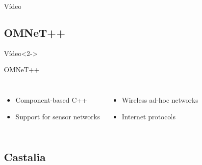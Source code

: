 \documentclass{beamer}
\begin{document}
\begin{frame}

\begin{exampleblock}{Vídeo}
	\centering
\end{exampleblock}

\end{frame}


\subsection{OMNeT++}

\begin{frame}

\begin{exampleblock}{Vídeo}<2->
	\centering
\end{exampleblock}

\begin{block}{OMNeT++}

\begin{columns}[c] %

	\begin{itemize}
		\item Component-based C++
		\item Support for sensor networks
	\end{itemize}
\begin{itemize}
		\item Wireless ad-hoc networks
		\item Internet protocols
	\end{itemize}
\end{columns}
\end{block}
\end{frame}

\subsection{Castalia}
\end{document}
